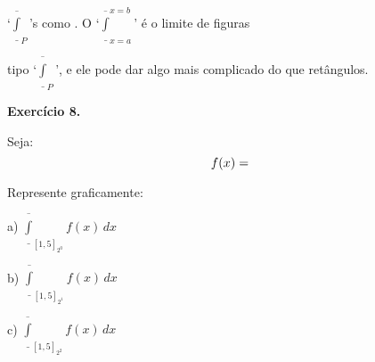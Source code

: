 \documentclass[oneside,12pt]{article}
\begin{document}
`$\overline{\underline{∫}}_P$'s como . O `$\overline{\underline{∫}}_{x=a}^{x=b}$' é o limite de
figuras

tipo `$\overline{\underline{∫}}_P$', e ele pode dar algo mais
complicado do que retângulos.

\newpage

{\bf Exercício 8.}

\def\Intoverunder #1#2{\overline{\underline{∫}}_{#1} #2\,dx}


Seja:
%
$$f(x) = \scalebox{0.5}{$\ga{Exercicio 5}$}$$

\def\iou#1{\overline{\underline{∫}}_{[1,5]_{2^#1}} {f(x)} \, dx}

Represente graficamente:

\ssk

a) $\iou0$

b) $\iou1$

c) $\iou2$






\newpage



% 
% 
% 
% 
% 



















\end{document}
